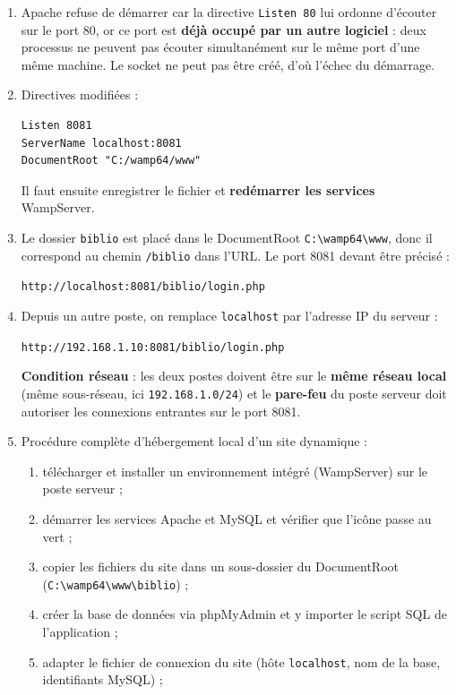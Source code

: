 \documentclass[11pt]{article}
\begin{document}
\begin{corrige}
\begin{enumerate}
\item Apache refuse de démarrer car la directive \texttt{Listen 80} lui ordonne d'écouter sur le port 80, or ce port est \textbf{déjà occupé par un autre logiciel} : deux processus ne peuvent pas écouter simultanément sur le même port d'une même machine. Le socket ne peut pas être créé, d'où l'échec du démarrage.
\item Directives modifiées :
\begin{lstlisting}[language=apacheconf]
Listen 8081
ServerName localhost:8081
DocumentRoot "C:/wamp64/www"
\end{lstlisting}
Il faut ensuite enregistrer le fichier et \textbf{redémarrer les services} WampServer.
\item Le dossier \texttt{biblio} est placé dans le DocumentRoot \texttt{C:\textbackslash wamp64\textbackslash www}, donc il correspond au chemin \texttt{/biblio} dans l'URL. Le port 8081 devant être précisé :
\begin{center}
\texttt{http://localhost:8081/biblio/login.php}
\end{center}
\item Depuis un autre poste, on remplace \texttt{localhost} par l'adresse IP du serveur :
\begin{center}
\texttt{http://192.168.1.10:8081/biblio/login.php}
\end{center}
\textbf{Condition réseau} : les deux postes doivent être sur le \textbf{même réseau local} (même sous-réseau, ici \texttt{192.168.1.0/24}) et le \textbf{pare-feu} du poste serveur doit autoriser les connexions entrantes sur le port 8081.
\item Procédure complète d'hébergement local d'un site dynamique :
\begin{enumerate}
\item télécharger et installer un environnement intégré (WampServer) sur le poste serveur ;
\item démarrer les services Apache et MySQL et vérifier que l'icône passe au vert ;
\item copier les fichiers du site dans un sous-dossier du DocumentRoot (\texttt{C:\textbackslash wamp64\textbackslash www\textbackslash biblio}) ;
\item créer la base de données via phpMyAdmin et y importer le script SQL de l'application ;
\item adapter le fichier de connexion du site (hôte \texttt{localhost}, nom de la base, identifiants MySQL) ;

\end{enumerate}
\end{enumerate}
\end{corrige}
\end{document}
